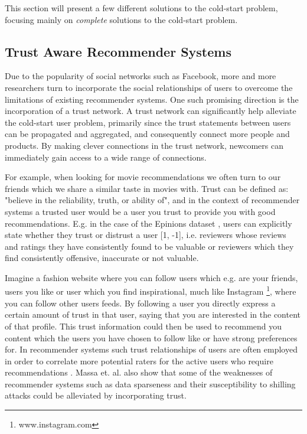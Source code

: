 This section will present a few different solutions to the cold-start problem, focusing mainly on \emph{complete} solutions to the cold-start problem.

\subsection{Trust Aware Recommender Systems}

Due to the popularity of social networks such as Facebook, more and more
researchers turn to incorporate the social relationships of users to overcome
the limitations of existing recommender systems. One such promising direction is
the incorporation of a trust network. A trust network can significantly help alleviate
the cold-start user problem, primarily since the trust statements between users can be propagated
and aggregated, and consequently connect more people and products. By making clever connections in
the trust network, newcomers can immediately gain access to a wide range of connections.


For example, when looking for movie recommendations we often turn to our friends which we share a similar
taste in movies with. Trust can be defined as: "believe in the reliability, truth, or ability of", and in
the context of recommender systems a trusted user would be a user you trust to provide you with good recommendations.
E.g. in the case of the Epinions dataset \cite{Epinions}, users can explicitly state whether they trust or distrust a
user [1, -1], i.e. reviewers whose reviews and ratings they have consistently found to be valuable or reviewers which
they find consistently offensive, inaccurate or not valuable.

Imagine a fashion website where you can follow users which e.g. are your friends, users you like or user which you find
inspirational, much like Instagram \footnote{www.instagram.com}, where you can follow other users feeds. By following a user you directly express a
certain amount of trust in that user, saying that you are interested in the content of that profile. This
trust information could then be used to recommend you content which the users you have chosen to follow like
or have strong preferences for. In recommender systems such trust relationships of users are often employed in order to correlate
more potential raters for the active users who require recommendations \cite{Massa2004, Massa2007}. Massa et. al. \cite{Massa2004}
also show that some of the weaknesses of recommender systems such as data sparseness and their susceptibility to shilling attacks
could be alleviated by incorporating trust.

